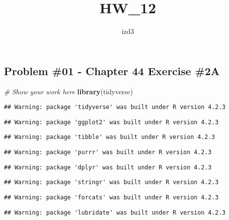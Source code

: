 \documentclass[
]{article}
\title{HW\_12}
\author{izd3}
\date{}
\newenvironment{Shaded}{\begin{snugshade}}{\end{snugshade}}
\newcommand{\CommentTok}[1]{\textcolor[rgb]{0.56,0.35,0.01}{\textit{#1}}}
\newcommand{\FunctionTok}[1]{\textcolor[rgb]{0.13,0.29,0.53}{\textbf{#1}}}
\newcommand{\NormalTok}[1]{#1}
\begin{document}
\maketitle

\newpage

\newpage

\hypertarget{problem-01---chapter-44-exercise-2a}{%
\subsection{Problem \#01 - Chapter 44 Exercise
\#2A}\label{problem-01---chapter-44-exercise-2a}}

\begin{Shaded}
\begin{Highlighting}[]
\CommentTok{\# Show your work here}
\FunctionTok{library}\NormalTok{(tidyverse)}
\end{Highlighting}
\end{Shaded}

\begin{verbatim}
## Warning: package 'tidyverse' was built under R version 4.2.3
\end{verbatim}

\begin{verbatim}
## Warning: package 'ggplot2' was built under R version 4.2.3
\end{verbatim}

\begin{verbatim}
## Warning: package 'tibble' was built under R version 4.2.3
\end{verbatim}

\begin{verbatim}
## Warning: package 'purrr' was built under R version 4.2.3
\end{verbatim}

\begin{verbatim}
## Warning: package 'dplyr' was built under R version 4.2.3
\end{verbatim}

\begin{verbatim}
## Warning: package 'stringr' was built under R version 4.2.3
\end{verbatim}

\begin{verbatim}
## Warning: package 'forcats' was built under R version 4.2.3
\end{verbatim}

\begin{verbatim}
## Warning: package 'lubridate' was built under R version 4.2.3
\end{verbatim}
\end{document}
